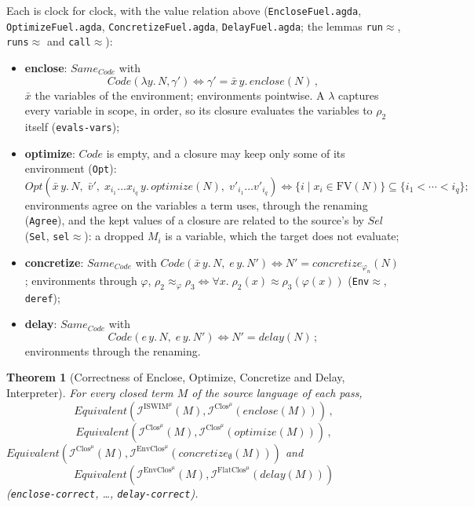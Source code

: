 \documentclass[10pt]{article}
\theoremstyle{acmplain}
\newtheorem{theorem}{Theorem}[section]
\newcommand{\pass}[1]{\mathit{#1}}
\newcommand{\lam}[1]{\lambda #1.\,}
\newcommand{\FV}{\mathrm{FV}}
\newcommand{\Equiv}{\mathit{Equivalent}}
\newcommand{\Interp}[1]{\mathcal{I}^{#1}}
\newcommand{\Same}{\mathit{Same}}
\newcommand{\Ml}[1]{\textrm{#1}^{\mu}}                  %
\begin{document}
Each is clock for clock, with the value relation above
(\texttt{EncloseFuel.agda}, \texttt{OptimizeFuel.agda},
\texttt{ConcretizeFuel.agda}, \texttt{DelayFuel.agda}; the lemmas
\texttt{run$\approx$}, \texttt{runs$\approx$} and \texttt{call$\approx$}):
\begin{itemize}
\item \textbf{enclose}: $\Same_{\mathit{Code}}$ with
  \[ \mathit{Code}(\lam{y} N, \gamma') \iff \gamma' = \bar{x}\, y.\, \pass{enclose}(N)\,, \]
  $\bar{x}$ the variables of the environment; environments pointwise. A
  $\lambda$ captures every variable in scope, in order, so its closure
  evaluates the variables to $\rho_2$ itself (\texttt{evals-vars});
\item \textbf{optimize}: $\mathit{Code}$ is empty, and a closure may keep
  only some of its environment (\texttt{Opt}):
  \[
    \mathit{Opt}(\bar{x}\, y.\, N,\; \bar{v}',\; x_{i_1} \ldots x_{i_q}\, y.\,
    \pass{optimize}(N),\; v'_{i_1} \ldots v'_{i_q}) \iff \{ i \mid x_i \in
    \FV(N) \} \subseteq \{ i_1 < \cdots < i_q \} ;
  \]
  environments
  agree on the variables a term uses, through the renaming (\texttt{Agree}),
  and the kept values of a closure are related to the source's by
  $\mathit{Sel}$ (\texttt{Sel}, \texttt{sel$\approx$}): a dropped $M_i$ is a
  variable, which the target does not evaluate;
\item \textbf{concretize}: $\Same_{\mathit{Code}}$ with
  $\mathit{Code}(\bar{x}\, y.\, N,\; e\, y.\, N') \iff N' =
  \pass{concretize}_{\varphi_n}(N)$; environments through $\varphi$,
  $\rho_2 \approx_\varphi \rho_3 \iff \forall x.\; \rho_2(x) \approx
  \rho_3(\varphi(x))$ (\texttt{Env$\approx$}, \texttt{deref});
\item \textbf{delay}: $\Same_{\mathit{Code}}$ with
  \[ \mathit{Code}(e\, y.\, N,\; e\, y.\, N') \iff N' = \pass{delay}(N)\,; \]
  environments through the renaming.
\end{itemize}
\begin{theorem}[Correctness of Enclose, Optimize, Concretize and Delay, Interpreter]\label{thm:m-interp-cc}
For every closed term $M$ of the source language of each pass,
\[ \Equiv(\Interp{\Ml{ISWIM}}(M), \Interp{\Ml{Clos}}(\pass{enclose}(M)))\,, \]
\[ \Equiv(\Interp{\Ml{Clos}}(M), \Interp{\Ml{Clos}}(\pass{optimize}(M)))\,, \]
$\Equiv(\Interp{\Ml{Clos}}(M), \Interp{\Ml{EnvClos}}(\pass{concretize}_\emptyset(M)))$ and
\[ \Equiv(\Interp{\Ml{EnvClos}}(M), \Interp{\Ml{FlatClos}}(\pass{delay}(M))) \]
(\texttt{enclose-correct}, \ldots, \texttt{delay-correct}).
\end{theorem}
\end{document}
